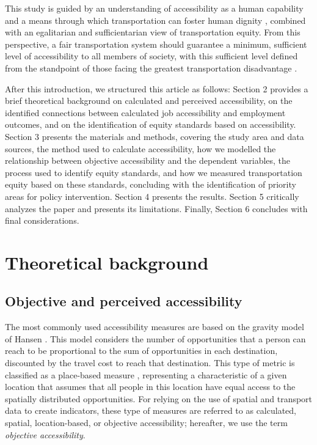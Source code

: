 \documentclass[preprint, 3p,
authoryear]{elsarticle} %
\begin{document}
This study is guided by an understanding of accessibility as a human
capability \citep{sen2005, sen1999, pereira2017, luz2022} and a means
through which transportation can foster human dignity
\citep{pereira2021, dossantos}, combined with an egalitarian and
sufficientarian view of transportation equity. From this perspective, a
fair transportation system should guarantee a minimum, sufficient level
of accessibility to all members of society, with this sufficient level
defined from the standpoint of those facing the greatest transportation
disadvantage \citep{martens2021}.

After this introduction, we structured this article as follows: Section
2 provides a brief theoretical background on calculated and perceived
accessibility, on the identified connections between calculated job
accessibility and employment outcomes, and on the identification of
equity standards based on accessibility. Section 3 presents the
materials and methods, covering the study area and data sources, the
method used to calculate accessibility, how we modelled the relationship
between objective accessibility and the dependent variables, the process
used to identify equity standards, and how we measured transportation
equity based on these standards, concluding with the identification of
priority areas for policy intervention. Section 4 presents the results.
Section 5 critically analyzes the paper and presents its limitations.
Finally, Section 6 concludes with final considerations.

\section{Theoretical background}\label{theoretical-background}

\subsection{Objective and perceived
accessibility}\label{objective-and-perceived-accessibility}

The most commonly used accessibility measures are based on the gravity
model of Hansen \citeyearpar{hansen1959}. This model considers the
number of opportunities that a person can reach to be proportional to
the sum of opportunities in each destination, discounted by the travel
cost to reach that destination. This type of metric is classified as a
place-based measure \citep{pereira2023}, representing a characteristic
of a given location that assumes that all people in this location have
equal access to the spatially distributed opportunities. For relying on
the use of spatial and transport data to create indicators, these type
of measures are referred to as calculated, spatial, location-based, or
objective accessibility; hereafter, we use the term \emph{objective
accessibility}.
\end{document}
